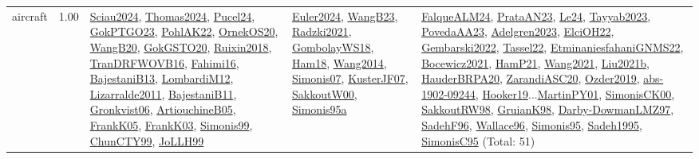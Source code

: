 {\begin{longtable}{p{3cm}r>{\raggedright\arraybackslash}p{6cm}>{\raggedright\arraybackslash}p{6cm}>{\raggedright\arraybackslash}p{8cm}}
\index{aircraft}\index{ApplicationAreas!aircraft}aircraft &  1.00 & \hyperref[detail:Sciau2024]{Sciau2024}, \hyperref[detail:Thomas2024]{Thomas2024}, \hyperref[detail:Pucel24]{Pucel24}, \hyperref[detail:GokPTGO23]{GokPTGO23}, \hyperref[detail:PohlAK22]{PohlAK22}, \hyperref[detail:OrnekOS20]{OrnekOS20}, \hyperref[detail:WangB20]{WangB20}, \hyperref[detail:GokGSTO20]{GokGSTO20}, \hyperref[detail:Ruixin2018]{Ruixin2018}, \hyperref[detail:TranDRFWOVB16]{TranDRFWOVB16}, \hyperref[detail:Fahimi16]{Fahimi16}, \hyperref[detail:BajestaniB13]{BajestaniB13}, \hyperref[detail:LombardiM12]{LombardiM12}, \hyperref[detail:Lizarralde2011]{Lizarralde2011}, \hyperref[detail:BajestaniB11]{BajestaniB11}, \hyperref[detail:Gronkvist06]{Gronkvist06}, \hyperref[detail:ArtiouchineB05]{ArtiouchineB05}, \hyperref[detail:FrankK05]{FrankK05}, \hyperref[detail:FrankK03]{FrankK03}, \hyperref[detail:Simonis99]{Simonis99}, \hyperref[detail:ChunCTY99]{ChunCTY99}, \hyperref[detail:JoLLH99]{JoLLH99} & \hyperref[detail:Euler2024]{Euler2024}, \hyperref[detail:WangB23]{WangB23}, \hyperref[detail:Radzki2021]{Radzki2021}, \hyperref[detail:GombolayWS18]{GombolayWS18}, \hyperref[detail:Ham18]{Ham18}, \hyperref[detail:Wang2014]{Wang2014}, \hyperref[detail:Simonis07]{Simonis07}, \hyperref[detail:KusterJF07]{KusterJF07}, \hyperref[detail:SakkoutW00]{SakkoutW00}, \hyperref[detail:Simonis95a]{Simonis95a} & \hyperref[detail:FalqueALM24]{FalqueALM24}, \hyperref[detail:PrataAN23]{PrataAN23}, \hyperref[detail:Le24]{Le24}, \hyperref[detail:Tayyab2023]{Tayyab2023}, \hyperref[detail:PovedaAA23]{PovedaAA23}, \hyperref[detail:Adelgren2023]{Adelgren2023}, \hyperref[detail:ElciOH22]{ElciOH22}, \hyperref[detail:Gembarski2022]{Gembarski2022}, \hyperref[detail:Tassel22]{Tassel22}, \hyperref[detail:EtminaniesfahaniGNMS22]{EtminaniesfahaniGNMS22}, \hyperref[detail:Bocewicz2021]{Bocewicz2021}, \hyperref[detail:HamP21]{HamP21}, \hyperref[detail:Wang2021]{Wang2021}, \hyperref[detail:Liu2021b]{Liu2021b}, \hyperref[detail:HauderBRPA20]{HauderBRPA20}, \hyperref[detail:ZarandiASC20]{ZarandiASC20}, \hyperref[detail:Ozder2019]{Ozder2019}, \hyperref[detail:abs-1902-09244]{abs-1902-09244}, \hyperref[detail:Hooker19]{Hooker19}...\hyperref[detail:MartinPY01]{MartinPY01}, \hyperref[detail:SimonisCK00]{SimonisCK00}, \hyperref[detail:SakkoutRW98]{SakkoutRW98}, \hyperref[detail:GruianK98]{GruianK98}, \hyperref[detail:Darby-DowmanLMZ97]{Darby-DowmanLMZ97}, \hyperref[detail:SadehF96]{SadehF96}, \hyperref[detail:Wallace96]{Wallace96}, \hyperref[detail:Simonis95]{Simonis95}, \hyperref[detail:Sadeh1995]{Sadeh1995}, \hyperref[detail:SimonisC95]{SimonisC95} (Total: 51)\\

\end{longtable}}
